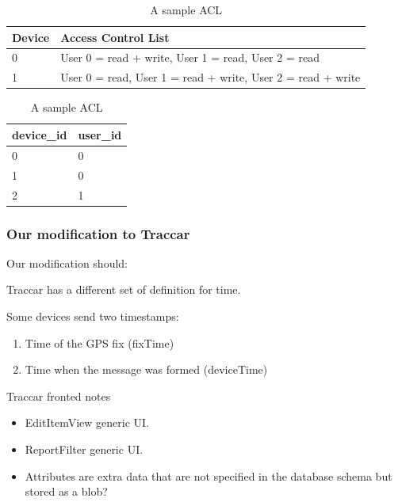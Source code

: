 \documentclass[a4paper]{article}
\begin{document}
\begin{table}[hbt!]
    \centering
    \sffamily
    \footnotesize
    \begin{tabularx}{0.7\textwidth}{l X}
        \toprule
        Device & Access Control List                                         \\
        \midrule
        0      & User 0 = read + write, User 1 = read, User 2 = read         \\
        1      & User 0 = read, User 1 = read + write, User 2 = read + write \\
        \bottomrule
    \end{tabularx}
    \normalfont
    \caption{A sample ACL}
    \label{tab:acl_example}
\end{table}

\begin{table}[hbt!]
    \centering
    \ttfamily
    \footnotesize
    \begin{tabular}{| l | l |}
        \hline
        device\_id & user\_id \\
        \hline
        0          & 0        \\
        \hline
        1          & 0        \\
        \hline
        2          & 1        \\
        \hline
    \end{tabular}
    \normalfont
    \caption{A sample ACL}
    \label{tab:acl_sql_table}
\end{table}

\subsubsection*{Our modification to Traccar}

{\raggedright Our modification should:}

Traccar has a different set of definition for time.

Some devices send two timestamps:

\begin{enumerate}
    \item Time of the GPS fix (fixTime)
    \item Time when the message was formed (deviceTime)
\end{enumerate}

{\raggedright Traccar fronted notes}

\begin{itemize}
    \item EditItemView generic UI.
    \item ReportFilter generic UI.
    \item Attributes are extra data that are not specified in the database schema but stored as a blob?
\end{itemize}
\end{document}
